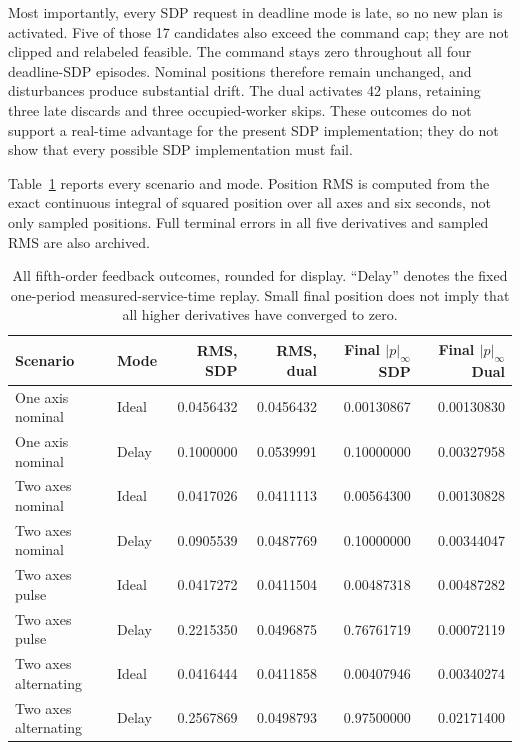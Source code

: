 \documentclass[pdflatex,sn-mathphys-num]{sn-jnl}
\theoremstyle{thmstyleone}
\theoremstyle{thmstyletwo}\newtheorem{remark}[theorem]{Remark}
\begin{document}
Most importantly, every SDP request in deadline mode is late, so no new
plan is activated. Five of those 17 candidates also exceed the command cap;
they are not clipped and relabeled feasible. The command stays zero throughout
all four deadline-SDP episodes. Nominal positions therefore remain unchanged,
and disturbances produce substantial drift. The dual activates 42 plans,
retaining three late discards and three occupied-worker skips. These outcomes
do not support a real-time advantage for the present SDP implementation;
they do not show that every possible SDP implementation must fail.

Table~\ref{tab:five-feedback-errors} reports every scenario and mode.
Position RMS is computed from the exact continuous integral of squared
position over all axes and six seconds, not only sampled positions. Full
terminal errors in all five derivatives and sampled RMS are also archived.
\begin{table}[htbp]
\centering\small
\caption{All fifth-order feedback outcomes, rounded for display. ``Delay''
denotes the fixed one-period measured-service-time replay. Small final position
does not imply that all higher derivatives have converged to zero.}
\label{tab:five-feedback-errors}
\begin{tabular}{llrrrr}
\toprule
Scenario & Mode & RMS, SDP & RMS, dual &
\shortstack{Final $|p|_\infty$\\SDP} & \shortstack{Final $|p|_\infty$\\Dual}\\
\midrule
One axis nominal & Ideal & 0.0456432 & 0.0456432 & 0.00130867 & 0.00130830\\
One axis nominal & Delay & 0.1000000 & 0.0539991 & 0.10000000 & 0.00327958\\
Two axes nominal & Ideal & 0.0417026 & 0.0411113 & 0.00564300 & 0.00130828\\
Two axes nominal & Delay & 0.0905539 & 0.0487769 & 0.10000000 & 0.00344047\\
Two axes pulse & Ideal & 0.0417272 & 0.0411504 & 0.00487318 & 0.00487282\\
Two axes pulse & Delay & 0.2215350 & 0.0496875 & 0.76761719 & 0.00072119\\
Two axes alternating & Ideal & 0.0416444 & 0.0411858 & 0.00407946 & 0.00340274\\
Two axes alternating & Delay & 0.2567869 & 0.0498793 & 0.97500000 & 0.02171400\\
\bottomrule
\end{tabular}
\end{table}
\end{document}

